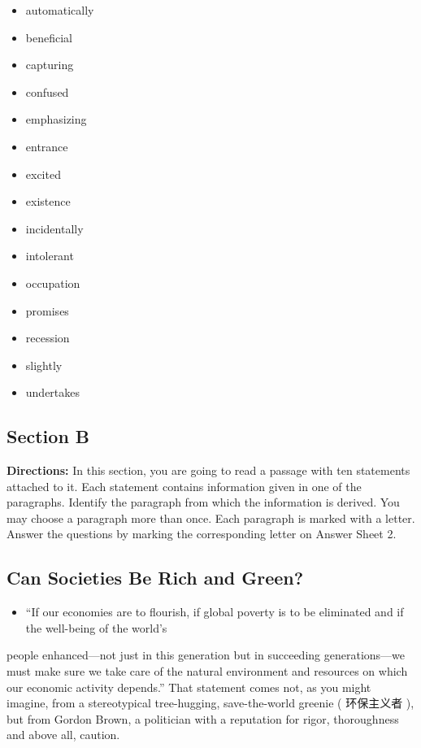 \documentclass[UTF8,11pt]{ctexart}
\begin{document}
\begin{itemize}[leftmargin=2em,itemsep=.2em,topsep=.4em]\item[A.] automatically
\item[B.] beneficial
\item[C.] capturing
\item[D.] confused
\item[E.] emphasizing
\item[F.] entrance
\item[G.] excited
\item[H.] existence
\item[I.] incidentally
\item[J.] intolerant
\item[K.] occupation
\item[L.] promises
\item[M.] recession
\item[N.] slightly
\item[O.] undertakes
\end{itemize}

\subsection*{\textbf{Section B}}


\textbf{Directions:} In this section, you are going to read a passage with ten statements attached to it. Each statement contains information given in one of the paragraphs. Identify the paragraph from which the information is derived. You may choose a paragraph more than once. Each paragraph is marked with a letter. Answer the questions by marking the corresponding letter on Answer Sheet 2.


\subsection*{\textbf{Can Societies Be Rich and Green?}}


\begin{itemize}[leftmargin=2em,itemsep=.2em,topsep=.4em]\item[A.] “If our economies are to flourish, if global poverty is to be eliminated and if the well-being of the world’s
\end{itemize}

people enhanced—not just in this generation but in succeeding generations—we must make sure we take care of the natural environment and resources on which our economic activity depends.” That statement comes not, as you might imagine, from a stereotypical tree-hugging, save-the-world greenie ( 环保主义者 ), but from Gordon Brown, a politician with a reputation for rigor, thoroughness and above all, caution.
\end{document}
